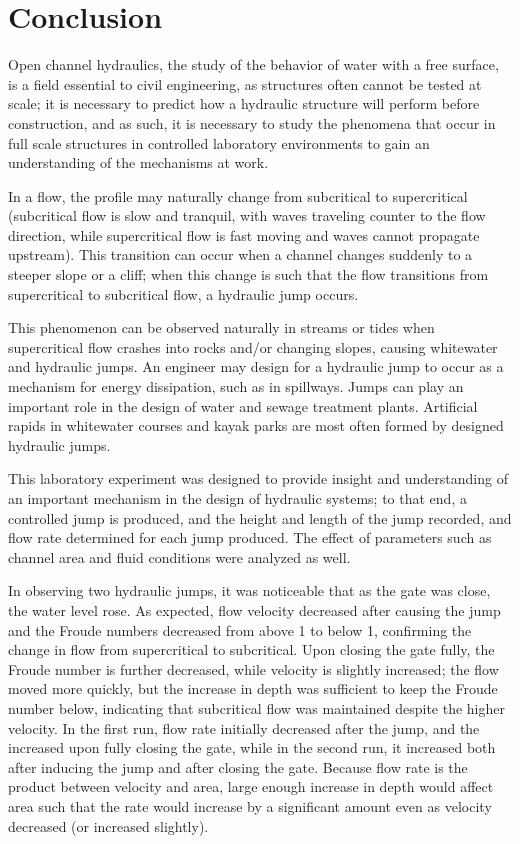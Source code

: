 \documentclass{article}
\begin{document}
\section{Conclusion}
\par Open channel hydraulics, the study of the behavior of water with a free surface, is a field essential to civil engineering, as structures often cannot be tested at scale; it is necessary to predict how a hydraulic structure will perform before construction, and as such, it is necessary to study the phenomena that occur in full scale structures in controlled laboratory environments to gain an understanding of the mechanisms at work. 
\par In a flow, the profile may naturally change from subcritical to supercritical (subcritical flow is slow and tranquil, with waves traveling counter to the flow direction, while supercritical flow is fast moving and waves cannot propagate upstream). This transition can occur when a channel changes suddenly to a steeper slope or a cliff; when this change is such that the flow transitions from supercritical to subcritical flow, a hydraulic jump occurs. 
\par This phenomenon can be observed naturally in streams or tides when supercritical flow crashes into rocks and/or changing slopes, causing whitewater and hydraulic jumps. An engineer may design for a hydraulic jump to occur as a mechanism for energy dissipation, such as in spillways. Jumps can play an important role in the design of water and sewage treatment plants.  Artificial rapids in whitewater courses and kayak parks are most often formed by designed hydraulic jumps. 
\par This laboratory experiment was designed to provide insight and understanding of an important mechanism in the design of hydraulic systems; to that end, a controlled jump is produced, and the height and length of the jump recorded, and flow rate determined for each jump produced. The effect of parameters such as channel area and fluid conditions were analyzed as well. 
\par In observing two hydraulic jumps, it was noticeable that as the gate was close, the water level rose. As expected, flow velocity decreased after causing the jump and the Froude numbers decreased from above 1 to below 1, confirming the change in flow from supercritical to subcritical. Upon closing the gate fully, the Froude number is further decreased, while velocity is slightly increased; the flow moved more quickly, but the increase in depth was sufficient to keep the Froude number below, indicating that subcritical flow was maintained despite the higher velocity. In the first run, flow rate initially decreased after the jump, and the increased upon fully closing the gate, while in the second run, it increased both after inducing the jump and after closing the gate. Because flow rate is the product between velocity and area, large enough increase in depth would affect area such that the rate would increase by a significant amount even as velocity decreased (or increased slightly). 
\end{document}
